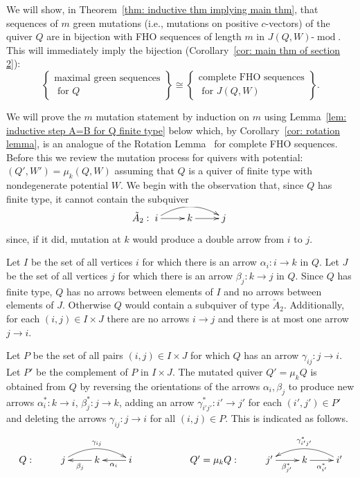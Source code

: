 \documentclass[ALCO,ThmDefs,Unicode,epreuves]{cedram}
\DeclareMathOperator{\modr}{mod}
\begin{document}
We will show, in Theorem~\ref{thm: inductive thm implying main thm}, that sequences of $m$ green mutations (i.e., mutations on positive $c$-vectors) of the quiver $Q$ are in bijection with FHO sequences of length $m$ in $J(Q,W)\text{-}\modr $. This will immediately imply the bijection (Corollary~\ref{cor: main thm of section 2}):
\[
	\left\{\begin{array}{cc}
	\text{maximal green sequences}\\
	\text{ for $Q$}
	\end{array}
	\right\}
\cong 
	\left\{\begin{array}{cc}
	\text{complete FHO sequences}\\
	\text{ for $J(Q,W)$}
	\end{array}
	\right\}.
\]



We will prove the $m$ mutation statement by induction on $m$ using Lemma~\ref{lem: inductive step A=B for Q finite type} below which, by Corollary~\ref{cor: rotation lemma}, is an analogue of the Rotation Lemma~\cite{BHIT} for complete FHO sequences. Before this we review the mutation process for quivers with potential: $(Q',W')=\mu_k(Q,W)$ assuming that $Q$ is a quiver of finite type with nondegenerate potential $W$. We begin with the observation that, since $Q$ has finite type, it cannot contain the subquiver 
\[
	\tilde A_2:\xymatrix{ i\ar@/^1pc/[rr]\ar[r] &k\ar[r] & j}
\]
since, if it did, mutation at $k$ would produce a double arrow from $i$ to $j$.


Let $I$ be the set of all vertices $i$ for which there is an arrow $\alpha_i:i\to k$ in $Q$. Let $J$ be the set of all vertices $j$ for which there is an arrow $\beta_j:k\to j$ in $Q$. Since $Q$ has finite type, $Q$ has no arrows between elements of $I$ and no arrows between elements of $J$. Otherwise $Q$ would contain a subquiver of type $\tilde A_2$. Additionally, for each $(i, j) \in  I \times J$ there are no arrows $i \rightarrow j$ and there is at most one arrow $j \rightarrow i$.



Let $P$ be the set of all pairs $(i,j)\in I\times J$ for which $Q$ has an arrow $\gamma_{ij}:j\to i$. Let $P'$ be the complement of $P$ in $I\times J$. The mutated quiver $Q'=\mu_kQ$ is obtained from $Q$ by reversing the orientations of the arrows $\alpha_i,\beta_j$ to produce new arrows $\alpha_i^\ast:k\to i$, $\beta_j^\ast:j\to k$, adding an arrow $\gamma_{i'j'}^\ast:i'\to j'$ for each $(i',j')\in P'$ and deleting the arrows $\gamma_{ij}:j\to i$ for all $(i,j)\in P$. This is indicated as follows.%
\[
\xymatrix{%
Q: & j\ar@/^1pc/[rr]^{\gamma_{ij}} &k\ar[l]^{\beta_j} & i\ar[l]^{\alpha_i}%
&& Q'=\mu_k Q: & j'\ar[r]_{\beta_{j'}^\ast}%
&k \ar[r]_{\alpha_{i'}^\ast} & i'\ar@/_1pc/[ll]_{\gamma_{i'j'}^\ast}
	}%
\]
\end{document}
